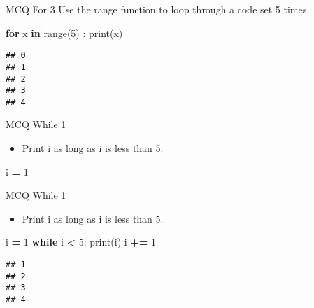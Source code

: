 \documentclass[
  8pt,
  ignorenonframetext,
]{beamer}
\newenvironment{Shaded}{\begin{snugshade}}{\end{snugshade}}
\newcommand{\BuiltInTok}[1]{#1}
\newcommand{\ControlFlowTok}[1]{\textcolor[rgb]{0.13,0.29,0.53}{\textbf{#1}}}
\newcommand{\DecValTok}[1]{\textcolor[rgb]{0.00,0.00,0.81}{#1}}
\newcommand{\KeywordTok}[1]{\textcolor[rgb]{0.13,0.29,0.53}{\textbf{#1}}}
\newcommand{\NormalTok}[1]{#1}
\newcommand{\OperatorTok}[1]{\textcolor[rgb]{0.81,0.36,0.00}{\textbf{#1}}}
\providecommand{\tightlist}{%
  \setlength{\itemsep}{0pt}\setlength{\parskip}{0pt}}
\begin{document}
\begin{frame}[fragile]{MCQ For 3}
\protect\hypertarget{mcq-for-3-1}{}
Use the range function to loop through a code set 5 times.

\begin{Shaded}
\begin{Highlighting}[]
\ControlFlowTok{for}\NormalTok{ x }\KeywordTok{in} \BuiltInTok{range}\NormalTok{(}\DecValTok{5}\NormalTok{) :}
  \BuiltInTok{print}\NormalTok{(x)}
\end{Highlighting}
\end{Shaded}

\begin{verbatim}
## 0
## 1
## 2
## 3
## 4
\end{verbatim}
\end{frame}

\begin{frame}[fragile]{MCQ While 1}
\protect\hypertarget{mcq-while-1}{}
\begin{itemize}
\tightlist
\item
  Print i as long as i is less than 5.
\end{itemize}

\begin{Shaded}
\begin{Highlighting}[]
\NormalTok{i }\OperatorTok{=} \DecValTok{1}
\end{Highlighting}
\end{Shaded}
\end{frame}

\begin{frame}[fragile]{MCQ While 1}
\protect\hypertarget{mcq-while-1-1}{}
\begin{itemize}
\tightlist
\item
  Print i as long as i is less than 5.
\end{itemize}

\begin{Shaded}
\begin{Highlighting}[]
\NormalTok{i }\OperatorTok{=} \DecValTok{1}
\ControlFlowTok{while}\NormalTok{ i }\OperatorTok{\textless{}} \DecValTok{5}\NormalTok{:}
  \BuiltInTok{print}\NormalTok{(i)}
\NormalTok{  i }\OperatorTok{+=} \DecValTok{1}
\end{Highlighting}
\end{Shaded}

\begin{verbatim}
## 1
## 2
## 3
## 4
\end{verbatim}
\end{frame}
\end{document}
